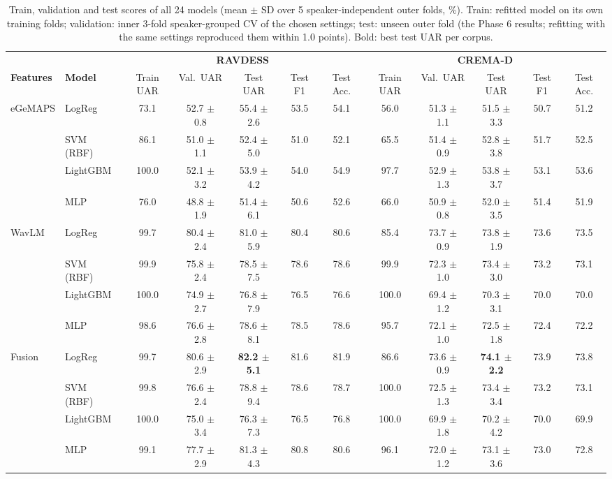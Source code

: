 \begin{table}[!t]
\centering
\caption{Train, validation and test scores of all 24 models (mean $\pm$ SD over 5 speaker-independent outer folds, \%). Train: refitted model on its own training folds; validation: inner 3-fold speaker-grouped CV of the chosen settings; test: unseen outer fold (the Phase 6 results; refitting with the same settings reproduced them within 1.0 points). Bold: best test UAR per corpus.}
\label{tab:tvt}
\footnotesize
\setlength{\tabcolsep}{4pt}
\begin{tabular}{@{}ll ccc cc @{\hspace{14pt}} ccc cc@{}}
\toprule
& & \multicolumn{5}{c}{\textbf{RAVDESS}} & \multicolumn{5}{c}{\textbf{CREMA-D}} \\
\cmidrule(lr){3-7}\cmidrule(l){8-12}
\textbf{Features} & \textbf{Model} & Train UAR & Val.\ UAR & Test UAR & Test F1 & Test Acc. & Train UAR & Val.\ UAR & Test UAR & Test F1 & Test Acc. \\
\midrule
eGeMAPS & LogReg & 73.1 & 52.7 $\pm$ 0.8 & 55.4 $\pm$ 2.6 & 53.5 & 54.1 & 56.0 & 51.3 $\pm$ 1.1 & 51.5 $\pm$ 3.3 & 50.7 & 51.2 \\
 & SVM (RBF) & 86.1 & 51.0 $\pm$ 1.1 & 52.4 $\pm$ 5.0 & 51.0 & 52.1 & 65.5 & 51.4 $\pm$ 0.9 & 52.8 $\pm$ 3.8 & 51.7 & 52.5 \\
 & LightGBM & 100.0 & 52.1 $\pm$ 3.2 & 53.9 $\pm$ 4.2 & 54.0 & 54.9 & 97.7 & 52.9 $\pm$ 1.3 & 53.8 $\pm$ 3.7 & 53.1 & 53.6 \\
 & MLP & 76.0 & 48.8 $\pm$ 1.9 & 51.4 $\pm$ 6.1 & 50.6 & 52.6 & 66.0 & 50.9 $\pm$ 0.8 & 52.0 $\pm$ 3.5 & 51.4 & 51.9 \\
\midrule
WavLM & LogReg & 99.7 & 80.4 $\pm$ 2.4 & 81.0 $\pm$ 5.9 & 80.4 & 80.6 & 85.4 & 73.7 $\pm$ 0.9 & 73.8 $\pm$ 1.9 & 73.6 & 73.5 \\
 & SVM (RBF) & 99.9 & 75.8 $\pm$ 2.4 & 78.5 $\pm$ 7.5 & 78.6 & 78.6 & 99.9 & 72.3 $\pm$ 1.0 & 73.4 $\pm$ 3.0 & 73.2 & 73.1 \\
 & LightGBM & 100.0 & 74.9 $\pm$ 2.7 & 76.8 $\pm$ 7.9 & 76.5 & 76.6 & 100.0 & 69.4 $\pm$ 1.2 & 70.3 $\pm$ 3.1 & 70.0 & 70.0 \\
 & MLP & 98.6 & 76.6 $\pm$ 2.8 & 78.6 $\pm$ 8.1 & 78.5 & 78.6 & 95.7 & 72.1 $\pm$ 1.0 & 72.5 $\pm$ 1.8 & 72.4 & 72.2 \\
\midrule
Fusion & LogReg & 99.7 & 80.6 $\pm$ 2.9 & \textbf{82.2 $\pm$ 5.1} & 81.6 & 81.9 & 86.6 & 73.6 $\pm$ 0.9 & \textbf{74.1 $\pm$ 2.2} & 73.9 & 73.8 \\
 & SVM (RBF) & 99.8 & 76.6 $\pm$ 2.4 & 78.8 $\pm$ 9.4 & 78.6 & 78.7 & 100.0 & 72.5 $\pm$ 1.3 & 73.4 $\pm$ 3.4 & 73.2 & 73.1 \\
 & LightGBM & 100.0 & 75.0 $\pm$ 3.4 & 76.3 $\pm$ 7.3 & 76.5 & 76.8 & 100.0 & 69.9 $\pm$ 1.8 & 70.2 $\pm$ 4.2 & 70.0 & 69.9 \\
 & MLP & 99.1 & 77.7 $\pm$ 2.9 & 81.3 $\pm$ 4.3 & 80.8 & 80.6 & 96.1 & 72.0 $\pm$ 1.2 & 73.1 $\pm$ 3.6 & 73.0 & 72.8 \\
\bottomrule
\end{tabular}
\end{table}
